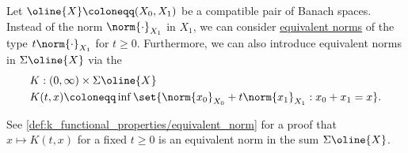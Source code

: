 \begin{definition}\label{def:k_functional}
  Let \( \oline{X} \coloneqq ( X_0, X_1 ) \) be a compatible pair of Banach spaces. Instead of the norm \( \norm{\cdot}_{X_1} \) in \( X_1 \), we can consider \hyperref[def:equivalent_metrics]{equivalent norms} of the type \( t\norm{\cdot}_{X_1} \) for \( t \geq 0 \). Furthermore, we can also introduce equivalent norms in \( \Sigma \oline{X} \) via the 
  \begin{equation}\label{eq:def:k_functional}
    \begin{aligned}
      &K: (0, \infty) \times {\Sigma \oline{X}} \\
      &K(t, x) \coloneqq \inf \set{ \norm{x_0}_{X_0} + t\norm{x_1}_{X_1} : x_0 + x_1 = x }.
    \end{aligned}
  \end{equation}

  See \cref{def:k_functional_properties/equivalent_norm} for a proof that \( x \mapsto K(t, x) \) for a fixed \( t \geq 0 \) is an equivalent norm in the sum \( \Sigma \oline{X} \).
\end{definition}

